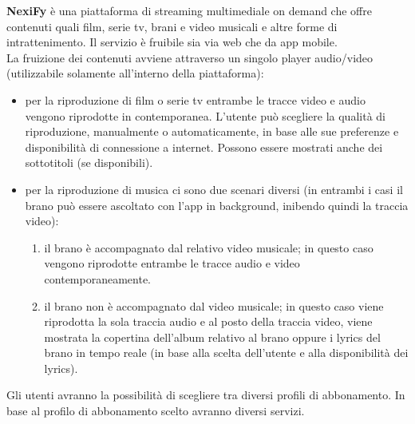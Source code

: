 \textbf{NexiFy} è una piattaforma di streaming multimediale on demand che offre contenuti quali film, serie tv, brani e video musicali e altre forme di intrattenimento. Il servizio è fruibile sia via web che da app mobile.\\

La fruizione dei contenuti avviene attraverso un singolo player audio/video (utilizzabile solamente all'interno della piattaforma):
\begin{itemize}\item per la riproduzione di film o serie tv entrambe le tracce video e audio vengono riprodotte in contemporanea. L’utente può scegliere la qualità di riproduzione, manualmente o automaticamente, in base alle sue preferenze e disponibilità di connessione a internet. Possono essere mostrati anche dei sottotitoli (se disponibili).
    \item per la riproduzione di musica ci sono due scenari diversi (in entrambi i casi il brano può essere ascoltato con l’app in background, inibendo quindi la traccia video):
    \begin{enumerate}
        \item il brano è accompagnato dal relativo video musicale; in questo caso vengono riprodotte entrambe le tracce audio e video contemporaneamente.
        \item il brano non è accompagnato dal video musicale; in questo caso viene riprodotta la sola traccia audio e al posto della traccia video, viene mostrata la copertina dell’album relativo al brano oppure i lyrics del brano in tempo reale (in base alla scelta dell’utente e alla disponibilità dei lyrics).
    \end{enumerate}
\end{itemize}

Gli utenti avranno la possibilità di scegliere tra diversi profili di abbonamento.
In base al profilo di abbonamento scelto avranno diversi servizi.\\

